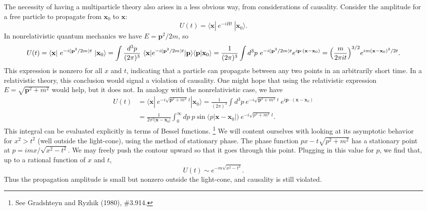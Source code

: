 The necessity of having a multiparticle theory also arises in a less
obvious way, from considerations of causality.  Consider the amplitude for
a free particle to propagate from $\mathbf{x}_0$ to $\mathbf{x}$:
\begin{equation}
  U(t) = \langle \mathbf{x}|\ e^{-iHt}\ |\mathbf{x}_0\rangle .
\end{equation}
In nonrelativistic quantum mechanics we have $E = \mathbf{p}^2/2m$, so
\begin{equation}
  U(t) = \langle \mathbf{x}|\ e^{-i(\mathbf{p}^2/2m)t}\ |\mathbf{x}_0\rangle
  = \int \frac{d^3p}{(2\pi)^3}\ \langle \mathbf{x}|
    e^{-i(\mathbf{p}^2/2m)t}|\mathbf{p}\rangle\langle \mathbf{p}|\mathbf{x}_0\rangle
  = \frac{1}{(2\pi)^3} \int d^3p\ e^{-i(\mathbf{p}^2/2m)t}
    e^{i\mathbf{p}\cdot(\mathbf{x}-\mathbf{x}_0)}
  = \Bigl( \frac{m}{2\pi it} \Bigr)^{3/2}
    e^{im(\mathbf{x}-\mathbf{x}_0)^2/2t}.
\end{equation}
This expression is nonzero for all $x$ and $t$, indicating that a particle
can propagate between any two points in an arbitrarily short time.  In a
relativistic theory, this conclusion would signal a violation of
causality.  One might hope that using the relativistic expression
$E=\sqrt{\mathbf{p}^2+m^2}$ would help, but it does not.  In analogy with
the nonrelativistic case, we have
\begin{align}
  U(t) &= \langle \mathbf{x}|\ e^{-i\sqrt{\mathbf{p}^2+m^2}\,t}
    |\mathbf{x}_0\rangle
  = \frac{1}{(2\pi)^3} \int d^3p\
    e^{-i\sqrt{\mathbf{p}^2+m^2}\,t}\ e^{i\mathbf{p}\cdot(\mathbf{x}-\mathbf{x}_0)}\\
  &= \frac{1}{2\pi^2|\mathbf{x}-\mathbf{x}_0|}
    \int_0^\infty dp\ p\sin\bigl(p|\mathbf{x}-\mathbf{x}_0|\bigr)\
    e^{-i\sqrt{p^2+m^2}\,t}.
\end{align}
This integral can be evaluated explicitly in terms of Bessel functions.%
\footnote{See Gradshteyn and Ryzhik (1980), \#3.914.}  We will content
ourselves with looking at its asymptotic behavior for $x^2 > t^2$ (well
outside the light-cone), using the method of stationary phase.  The phase
function $px - t\sqrt{p^2+m^2}$ has a stationary point at
$p = imx/\sqrt{x^2-t^2}$.  We may freely push the contour upward so that
it goes through this point.  Plugging in this value for $p$, we find that,
up to a rational function of $x$ and $t$,
\begin{equation}
  U(t) \sim e^{-m\sqrt{x^2-t^2}} .
\end{equation}
Thus the propagation amplitude is small but nonzero outside the
light-cone, and causality is still violated.

